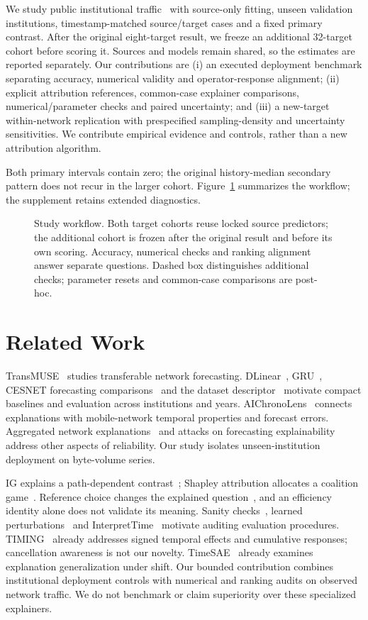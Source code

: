 \documentclass[conference]{IEEEtran}
\begin{document}
We study public institutional traffic~\cite{cesnet26,dataset} with source-only fitting, unseen validation institutions, timestamp-matched source/target cases and a fixed primary contrast. After the original eight-target result, we freeze an additional 32-target cohort before scoring it. Sources and models remain shared, so the estimates are reported separately. Our contributions are (i) an executed deployment benchmark separating accuracy, numerical validity and operator-response alignment; (ii) explicit attribution references, common-case explainer comparisons, numerical/parameter checks and paired uncertainty; and (iii) a new-target within-network replication with prespecified sampling-density and uncertainty sensitivities. We contribute empirical evidence and controls, rather than a new attribution algorithm.

Both primary intervals contain zero; the original history-median secondary pattern does not recur in the larger cohort. Figure~\ref{fig:pipeline} summarizes the workflow; the supplement retains extended diagnostics.

\begin{figure}[!t]\centering
\resizebox{\textwidth}{!}{}
\caption{Study workflow. Both target cohorts reuse locked source predictors; the additional cohort is frozen after the original result and before its own scoring. Accuracy, numerical checks and ranking alignment answer separate questions. Dashed box distinguishes additional checks; parameter resets and common-case comparisons are post-hoc.}\label{fig:pipeline}
\end{figure}

\section{Related Work}
TransMUSE~\cite{transmuse} studies transferable network forecasting. DLinear~\cite{dlinear}, GRU~\cite{gru}, CESNET forecasting comparisons~\cite{comparison} and the dataset descriptor~\cite{cesnet26} motivate compact baselines and evaluation across institutions and years. AIChronoLens~\cite{aichrono} connects explanations with mobile-network temporal properties and forecast errors. Aggregated network explanations~\cite{aggregated} and attacks on forecasting explainability~\cite{deexp} address other aspects of reliability. Our study isolates unseen-institution deployment on byte-volume series.

IG explains a path-dependent contrast~\cite{ig}; Shapley attribution allocates a coalition game~\cite{shap}. Reference choice changes the explained question~\cite{manyshap,baselines}, and an efficiency identity alone does not validate its meaning. Sanity checks~\cite{sanity}, learned perturbations~\cite{perturb} and InterpretTime~\cite{interprettime} motivate auditing evaluation procedures. TIMING~\cite{timing} already addresses signed temporal effects and cumulative responses; cancellation awareness is not our novelty. TimeSAE~\cite{timesae} already examines explanation generalization under shift. Our bounded contribution combines institutional deployment controls with numerical and ranking audits on observed network traffic. We do not benchmark or claim superiority over these specialized explainers.
\end{document}

